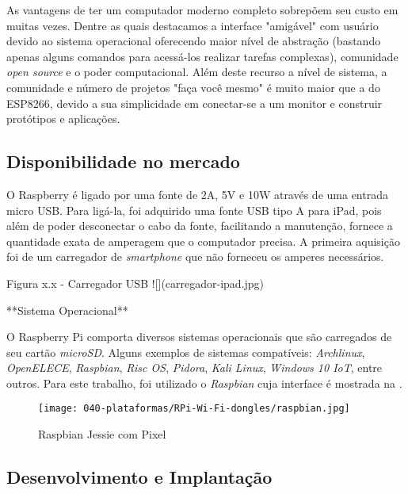 As vantagens de ter um computador moderno completo sobrepõem seu custo em muitas
vezes. Dentre as quais destacamos a interface "amigável" com usuário devido ao
sistema operacional oferecendo maior nível de abstração (bastando apenas alguns
comandos para acessá-los realizar tarefas complexas), comunidade \emph{open
source} e o poder computacional.
Além deste recurso a nível de sistema, a comunidade e número de projetos "faça
você mesmo" é muito maior que a do ESP8266, devido a sua simplicidade em
conectar-se a um monitor e construir protótipos e aplicações.


\subsection{Disponibilidade no mercado}
\label{subsec:mercado-esp}



O Raspberry é ligado por uma fonte de 2A, 5V e 10W através de uma entrada micro
USB. Para ligá-la, foi adquirido uma fonte USB tipo A para iPad, pois além de
poder desconectar o cabo da fonte, facilitando a manutenção, fornece a
quantidade exata de amperagem que o computador precisa. A primeira aquisição foi
de um carregador de \emph{smartphone} que não forneceu os amperes necessários.

Figura x.x - Carregador USB
![](carregador-ipad.jpg)


**Sistema Operacional**

O Raspberry Pi comporta diversos sistemas operacionais que são carregados de seu
cartão \emph{microSD}. Alguns exemplos de sistemas compatíveis:
\emph{Archlinux}, \emph{OpenELECE}, \emph{Raspbian}, \emph{Risc OS},
\emph{Pidora}, \emph{Kali Linux}, \emph{Windows 10 IoT}, entre outros. Para este
trabalho, foi utilizado o \emph{Raspbian} cuja interface é mostrada na
.

\begin{figure}[htb]
	\caption{\label{fig:raspbian-jessie}Raspbian Jessie com Pixel}
	\begin{center}
		\texttt{[image: 040-plataformas/RPi-Wi-Fi-dongles/raspbian.jpg]}
	\end{center}
\end{figure}



\subsection{Desenvolvimento e Implantação}
\label{subsec:dev-esp}


